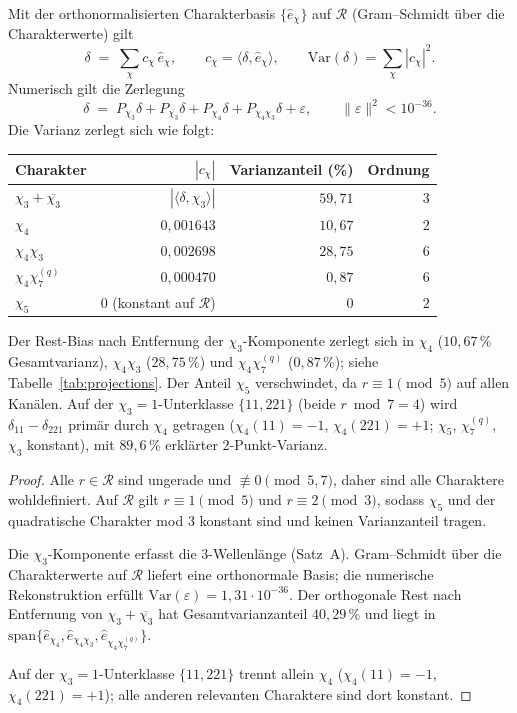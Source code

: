 \begin{theorem}
\label{thm:spectral-decomp}
Mit der orthonormalisierten Charakterbasis $\{\hat{e}_\chi\}$ auf
$\mathcal{R}$ (Gram--Schmidt über die Charakterwerte) gilt
\[
  \delta \;=\; \sum_{\chi} c_\chi\,\hat{e}_\chi,
  \qquad
  c_\chi = \langle\delta,\hat{e}_\chi\rangle,
  \qquad
  \mathrm{Var}(\delta) = \sum_\chi |c_\chi|^2.
\]
Numerisch gilt die Zerlegung
\[
  \boxed{
  \delta \;=\; P_{\chi_3}\delta + P_{\overline{\chi_3}}\delta
              + P_{\chi_4}\delta + P_{\chi_4\chi_3}\delta + \varepsilon,
  \qquad
  \|\varepsilon\|^2 < 10^{-36}.
  }
\]
Die Varianz zerlegt sich wie folgt:

\begin{center}
\begin{tabular}{lrrr}
\toprule
Charakter & $|c_\chi|$ & Varianzanteil (\%) & Ordnung \\
\midrule
$\chi_3 + \overline{\chi_3}$ & $|\langle\delta,\chi_3\rangle|$ & $59{,}71$ & $3$ \\
$\chi_4$ & $0{,}001643$ & $10{,}67$ & $2$ \\
$\chi_4\chi_3$ & $0{,}002698$ & $28{,}75$ & $6$ \\
$\chi_4\chi_7^{(q)}$ & $0{,}000470$ & $0{,}87$ & $6$ \\
$\chi_5$ & $0$ (konstant auf $\mathcal{R}$) & $0$ & $2$ \\
\bottomrule
\end{tabular}
\end{center}

Der Rest-Bias nach Entfernung der $\chi_3$-Komponente zerlegt sich in
$\chi_4$ ($10{,}67\,\%$ Gesamtvarianz), $\chi_4\chi_3$ ($28{,}75\,\%$)
und $\chi_4\chi_7^{(q)}$ ($0{,}87\,\%$); siehe Tabelle~\ref{tab:projections}.
Der Anteil $\chi_5$ verschwindet, da $r\equiv 1\pmod{5}$ auf allen Kanälen.
Auf der $\chi_3=1$-Unterklasse $\{11,221\}$ (beide $r\bmod 7 = 4$)
wird $\delta_{11}-\delta_{221}$ primär durch $\chi_4$ getragen
($\chi_4(11)=-1$, $\chi_4(221)=+1$; $\chi_5$, $\chi_7^{(q)}$, $\chi_3$ konstant),
mit $89{,}6\,\%$ erklärter $2$-Punkt-Varianz.
\end{theorem}

\begin{proof}
Alle $r\in\mathcal{R}$ sind ungerade und $\not\equiv 0\pmod{5,7}$, daher
sind alle Charaktere wohldefiniert.
Auf $\mathcal{R}$ gilt $r \equiv 1 \pmod{5}$ und $r \equiv 2 \pmod{3}$,
sodass $\chi_5$ und der quadratische Charakter mod $3$ konstant sind
und keinen Varianzanteil tragen.

Die $\chi_3$-Komponente erfasst die $3$-Wellenlänge (Satz~A).
Gram--Schmidt über die Charakterwerte auf $\mathcal{R}$ liefert eine
orthonormale Basis; die numerische Rekonstruktion erfüllt
$\mathrm{Var}(\varepsilon)=1{,}31\cdot 10^{-36}$.
Der orthogonale Rest nach Entfernung von $\chi_3+\overline{\chi_3}$
hat Gesamtvarianzanteil $40{,}29\,\%$ und liegt in
$\mathrm{span}\{\hat{e}_{\chi_4},\hat{e}_{\chi_4\chi_3},\hat{e}_{\chi_4\chi_7^{(q)}}\}$.

Auf der $\chi_3=1$-Unterklasse $\{11,221\}$ trennt allein $\chi_4$
($\chi_4(11)=-1$, $\chi_4(221)=+1$); alle anderen relevanten Charaktere
sind dort konstant.
\end{proof}


